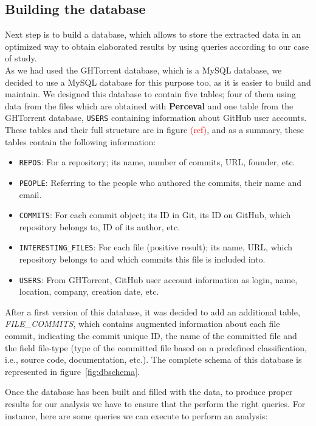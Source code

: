 \documentclass[a4paper, 12pt]{book}
\begin{document}
\subsection{Building the database}
\label{ssec:build-database}
Next step is to build a database, which allows to store the extracted data in an optimized way to
obtain elaborated results by using queries according to our case of study.\\
As we had used the GHTorrent database, which is a MySQL database, we decided to use a MySQL database
for this purpose too, as it is easier to build and maintain.
We designed this database to contain five tables; four of them using data from the files which are obtained with
\textbf{Perceval} and one table from the GHTorrent database, \texttt{USERS} containing information about GitHub user accounts.
These tables and their full structure are in figure \textcolor{red}{(ref)}, and as a summary, these tables contain the following information:
\begin{itemize}
  \item \texttt{REPOS}: For a repository; its name, number of commits, URL, founder, etc.
  \item \texttt{PEOPLE}: Referring to the people who authored the commits, their name and email.
  \item \texttt{COMMITS}: For each commit object; its ID in Git, its ID on GitHub, which repository belongs to, ID of its author, etc.
  \item \texttt{INTERESTING\_FILES}: For each file (positive result); its name, URL, which repository belongs to and which commits this file is included into.
  \item \texttt{USERS}: From GHTorrent, GitHub user account information as login, name, location, company, creation date, etc.
\end{itemize}
After a first version of this database, it was decided to add an additional table, \textit{FILE\_COMMITS},
which contains augmented information about each file commit, indicating the commit unique ID, the name of the committed file and the field
file-type (type of the committed file based on a predefined classification, i.e., source code, documentation, etc.).
The complete schema of this database is represented in figure~\ref{fig:dbschema}.\par
Once the database has been built and filled with the data, to produce proper results for our analysis we have to ensure
that the perform the right queries. For instance, here are some queries we can execute to perform an analysis:
\end{document}

